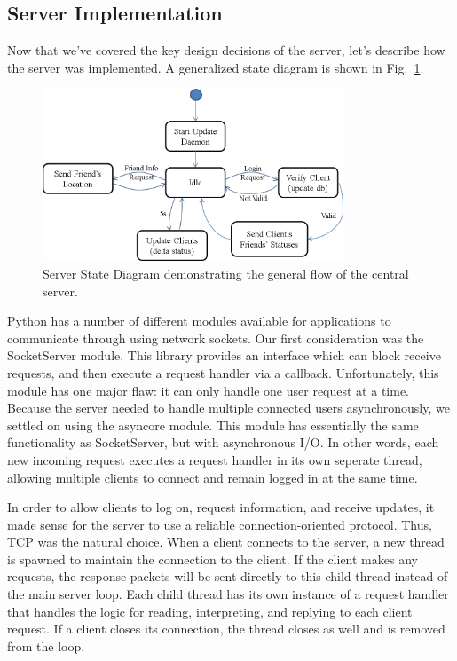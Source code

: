 \subsection{Server Implementation}
Now that we've covered the key design decisions of the server, let's describe how the server
was implemented. A generalized state diagram is shown in Fig.~\ref{fig:server_diag}.

\begin{figure}[!t]
   \centering
      \includegraphics[width=0.8\textwidth]{pics/Server_StateDiagram}
   \caption{Server State Diagram demonstrating the general flow of the central server.}
\label{fig:server_diag}
\end{figure}


Python has a number of different modules available for applications to communicate
through using network sockets. Our first consideration was the SocketServer module. This 
library
provides an interface which can block receive requests, and then execute a request
handler via a callback. Unfortunately, this module has one major flaw: it can only handle
one user request at a time. Because the server needed to handle multiple connected users
asynchronously, we settled on using the asyncore module. This module has essentially
the same functionality as SocketServer, but with asynchronous I/O. In other words, each
new incoming request executes a request handler in its own seperate thread, allowing 
multiple clients to connect and remain logged in at the same time.

In order to allow clients to log on, request information, and receive updates, it made
sense for the server to use a reliable connection-oriented protocol. Thus, TCP was the 
natural
choice. When a client connects to the server, a new thread is spawned to maintain
the connection to the client. If the client makes any requests, the response packets will 
be sent
directly to this child thread instead of the main server loop. Each child thread has its own
instance of a request handler that handles the logic for reading, interpreting, and replying
to each client request. If a client closes its connection, the thread closes as well and is
removed from the loop. 

